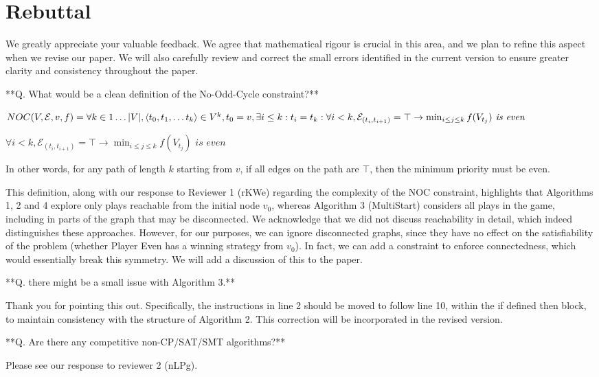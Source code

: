 \documentclass{article}
\begin{document}

\section*{Rebuttal}

We greatly appreciate your valuable feedback. We agree that mathematical rigour is crucial in this area, and we plan to refine this aspect when we revise our paper. We will also carefully review and correct the small errors identified in the current version to ensure greater clarity and consistency throughout the paper.

**Q. What would be a clean definition of the No-Odd-Cycle constraint?**

$
NOC(V,\mathcal{E},v,f) =\\ \forall k\in 1\dots|V|, 
\langle t_0,t_1, \dots t_k \rangle\in V^k, 
t_0 = v,  \exists i \leq k : t_i = t_k :\\
\forall i<k, \mathcal{E}_{(t_i,t_{i+1})} = \top 
\rightarrow \min_{i\leq j\leq k} f(V_{t_j})\textit{ is even}
$

$\forall i<k, \mathcal{E}_{(t_i,t_{i+1})} = \top \rightarrow \min_{i\leq j\leq k} f(V_{t_j})\textit{ is even}$


In other words, for any path of length $k$ starting from $v$, if all edges on the path are $\top$, then the minimum priority must be even.

This definition, along with our response to Reviewer 1 (rKWe) regarding the complexity of the NOC constraint, highlights that Algorithms 1, 2 and 4 explore only plays reachable from the initial node $v_0$, whereas Algorithm 3 (MultiStart) considers all plays in the game, including in parts of the graph that may be disconnected. We acknowledge that we did not discuss reachability in detail, which indeed distinguishes these approaches. However, for our purposes, we can ignore disconnected graphs, since they have no effect on the satisfiability of the problem (whether Player Even has a winning strategy from $v_0$). In fact, we can add a constraint to enforce connectedness, which would essentially break this symmetry. We will add a discussion of this to the paper.

**Q. there might be a small issue with Algorithm 3.**

Thank you for pointing this out. Specifically, the instructions in line 2 should be moved to follow line 10, within the if defined then block, to maintain consistency with the structure of Algorithm 2. This correction will be incorporated in the revised version.

**Q. Are there any competitive non-CP/SAT/SMT algorithms?**

Please see our response to reviewer 2 (nLPg).
\end{document}
